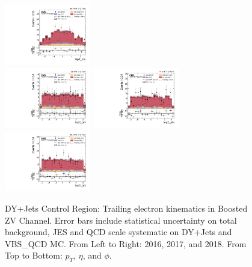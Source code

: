 \begin{figure}[!ht]
  \includegraphics[width=0.335\textwidth]{analysis_plots/2018_zv/cr_vjets_e/lep2_eta.pdf} \hspace{-10pt} \\
  \includegraphics[width=0.335\textwidth]{analysis_plots/2016_zv/cr_vjets_e/lep2_phi.pdf} \hspace{-10pt}
  \includegraphics[width=0.335\textwidth]{analysis_plots/2017_zv/cr_vjets_e/lep2_phi.pdf} \hspace{-10pt}
  \includegraphics[width=0.335\textwidth]{analysis_plots/2018_zv/cr_vjets_e/lep2_phi.pdf} \hspace{-10pt} \\
  \caption[DY+Jets Control Region: Trailing electron kinematics in Boosted ZV Channel]%
  {DY+Jets Control Region: Trailing electron kinematics in Boosted ZV Channel.
    Error bars include statistical uncertainty on total background,
    JES and QCD scale systematic on DY+Jets and VBS\_QCD MC\@. From Left to Right: 2016,
    2017, and 2018. From Top to Bottom: \( p_T \), \( \eta \), and \( \phi \).}%
  \label{fig:zv-cr-vjets-e-lep2-pt-eta-phi}
\end{figure}

